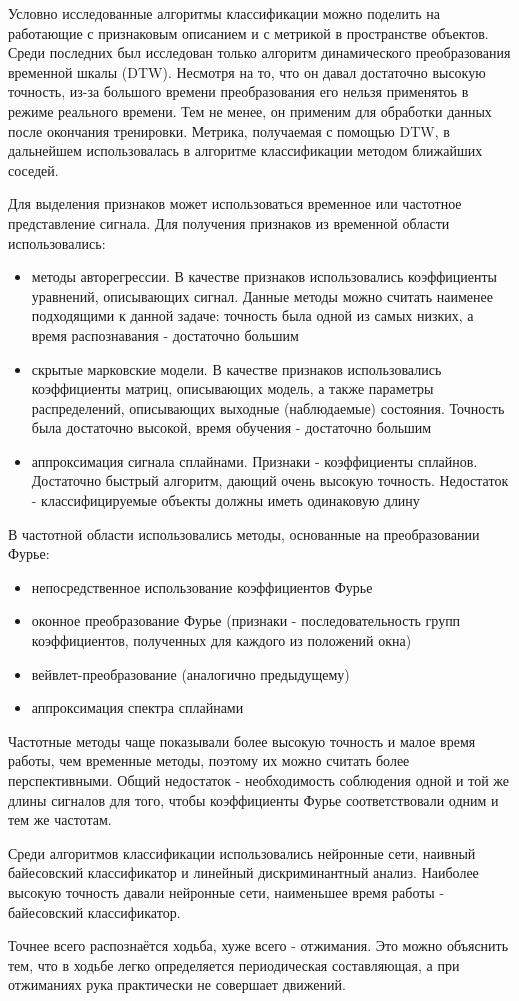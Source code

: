 Условно исследованные алгоритмы классификации можно поделить на работающие с признаковым описанием и с метрикой в пространстве объектов. Среди последних был исследован только алгоритм динамического преобразования временной шкалы (DTW). Несмотря на то, что он давал достаточно высокую точность, из-за большого времени преобразования его нельзя применятоь в режиме реального времени. Тем не менее, он применим для обработки данных после окончания тренировки. Метрика, получаемая с помощью DTW, в дальнейшем использовалась в алгоритме классификации методом ближайших соседей.

Для выделения признаков может использоваться временное или частотное представление сигнала. Для получения признаков из временной области использовались:
\begin{itemize}
\item методы авторегрессии. В качестве признаков использовались коэффициенты уравнений, описывающих сигнал. Данные методы можно считать наименее подходящими к данной задаче: точность была одной из самых низких, а время распознавания - достаточно большим
\item скрытые марковские модели. В качестве признаков использовались коэффициенты матриц, описывающих модель, а также параметры распределений, описывающих выходные (наблюдаемые) состояния. Точность была достаточно высокой, время обучения - достаточно большим
\item аппроксимация сигнала сплайнами. Признаки - коэффициенты сплайнов. Достаточно быстрый алгоритм, дающий очень высокую точность. Недостаток - классифицируемые объекты должны иметь одинаковую длину
\end{itemize}

В частотной области использовались методы, основанные на преобразовании Фурье:
\begin{itemize}
\item непосредственное использование коэффициентов Фурье
\item оконное преобразование Фурье (признаки - последовательность групп коэффициентов, полученных для каждого из положений окна)
\item вейвлет-преобразование (аналогично предыдущему)
\item аппроксимация спектра сплайнами
\end{itemize}

Частотные методы чаще показывали более высокую точность и малое время работы, чем временные методы, поэтому их можно считать более перспективными. Общий недостаток - необходимость соблюдения одной и той же длины сигналов для того, чтобы коэффициенты Фурье соответствовали одним и тем же частотам.

Среди алгоритмов классификации использовались нейронные сети, наивный байесовский классификатор и линейный дискриминантный анализ. Наиболее высокую точность давали нейронные сети, наименьшее время работы - байесовский классификатор.

Точнее всего распознаётся ходьба, хуже всего - отжимания. Это можно объяснить тем, что в ходьбе легко определяется периодическая составляющая, а при отжиманиях рука практически не совершает движений.

